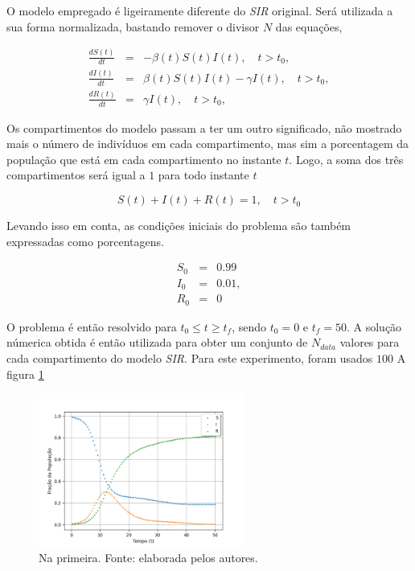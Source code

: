 O modelo empregado é ligeiramente diferente do \textit{SIR} original. 
Será utilizada a sua forma normalizada, bastando remover o divisor $N$
das equações,

\begin{eqnarray}
   \frac{dS(t)}{dt} &=& -\beta(t) S(t) I(t),  \quad t > t_0, \label{eq:SIR-beta-t-1-norm}\\
   \frac{dI(t)}{dt} &=& \beta(t) S(t) I(t) - \gamma I(t), \quad t > t_0, \label{eq:SIR-beta-t-2-norm}\\
   \frac{dR(t)}{dt} &=& \gamma I(t),  \quad t > t_0, \label{eq:SIR-beta-t-3-norm}
\end{eqnarray}

Os compartimentos do modelo passam a ter um outro significado, não mostrado
mais o número de indivíduos em cada compartimento, mas sim a porcentagem 
da população que está em cada compartimento no instante $t$. 
Logo, a soma dos três compartimentos será igual a $1$ para todo instante $t$

\begin{equation}
    S(t) + I(t) + R(t) = 1, \quad t > t_0
\end{equation}

Levando isso em conta, as condições iniciais do problema são também expressadas
como porcentagens.

\begin{eqnarray}
   S_0 &=& 0.99 \label{eq:S0}\\
   I_0 &=& 0.01, \label{eq:I0}\\
   R_0 &=& 0 \label{eq:R0}
\end{eqnarray}

O problema é então resolvido para $t_0 \le t \ge t_f$, sendo $t_0=0$ e $t_f=50$.
A solução númerica obtida é então utilizada para obter um conjunto de 
$N_{data}$ valores para cada compartimento do modelo \textit{SIR}. 
Para este experimento, foram usados $100$ A figura \ref{fig:dados-semruido} 

\begin{figure}[htpb]
\centering
\includegraphics[width=0.6\textwidth]{figuras/runge-kutta-compartiments-data-sir-nonoise.png}
\caption{Na primeira. Fonte: elaborada pelos autores.}
\label{fig:dados-semruido}
\end{figure}

